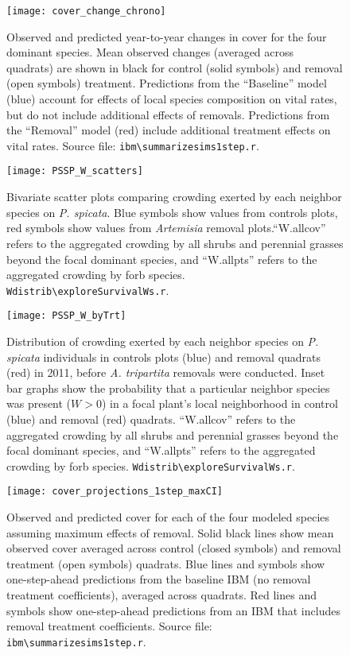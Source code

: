 \documentclass[11pt]{article}
\begin{document}
  \begin{figure}[tbp]
  \centering
  \texttt{[image: cover\_change\_chrono]}
  \caption{Observed and predicted year-to-year changes in cover for the four dominant species. Mean observed changes (averaged across quadrats) are shown in black for control (solid symbols) and removal (open symbols) treatment. Predictions from the ``Baseline'' model (blue) account for effects of local species composition on vital rates, but do not include additional effects of removals. Predictions from the ``Removal'' model (red) include additional treatment effects on vital rates. Source file: \texttt{ibm\textbackslash summarize\textunderscore sims1step.r}. }
  \label{fig:CoverChange}
  \end{figure}
 
  \begin{figure}[tbp]
  \centering
  \texttt{[image: PSSP\_W\_scatters]}
  \caption{Bivariate scatter plots comparing crowding exerted by each neighbor species on \textit{P. spicata}. Blue symbols show values from controls plots, red symbols show values from \textit{Artemisia} removal plots.``W.allcov'' refers to the aggregated crowding by all shrubs and perennial grasses beyond the focal dominant species, and ``W.allpts'' refers to the aggregated crowding by forb species.  \texttt{Wdistrib\textbackslash exploreSurvivalWs.r}. }
  \label{fig:Wscatters}
  \end{figure}
  
  \begin{figure}[tbp]
 \centering
 \texttt{[image: PSSP\_W\_byTrt]}
 \caption{Distribution of crowding exerted by each neighbor species on \textit{P. spicata} individuals in controls plots (blue) and removal quadrats (red) in 2011, before \textit{A. tripartita}  removals were conducted. Inset bar graphs show the probability that a particular neighbor species was present ($W>0$) in a focal plant's local neighborhood in control (blue) and removal (red) quadrats. ``W.allcov'' refers to the aggregated crowding by all shrubs and perennial grasses beyond the focal dominant species, and ``W.allpts'' refers to the aggregated crowding by forb species.  \texttt{Wdistrib\textbackslash exploreSurvivalWs.r}. }
 \label{fig:W-by-treatment}
 \end{figure}

 \begin{figure}[tbp]
 \centering
 \texttt{[image: cover\_projections\_1step\_maxCI]}
 \caption{Observed and predicted cover for each of the four modeled species assuming maximum effects of removal. 
  Solid black lines show mean observed cover averaged across control (closed symbols) and removal treatment (open symbols) quadrats. Blue lines and symbols show one-step-ahead predictions from the baseline IBM (no removal treatment coefficients), averaged across quadrats. Red lines and symbols show one-step-ahead predictions from an IBM that includes removal treatment coefficients. Source file: \texttt{ibm\textbackslash summarize\textunderscore sims1step.r}. }
 \label{fig:IBM1step-maxCI}
 \end{figure}
 
\end{document}

